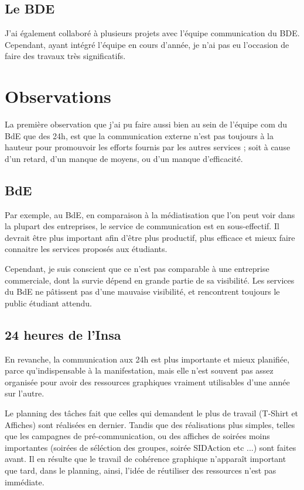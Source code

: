     \subsection{Le BDE}
    
        J'ai également collaboré à plusieurs projets avec l'équipe communication du BDE.
        Cependant, ayant intégré l'équipe en cours d'année, je n'ai pas eu l'occasion de faire des travaux très significatifs.

\section{Observations}

    La première observation que j'ai pu faire aussi bien au sein de l'équipe com du BdE que des 24h, est que la communication externe n'est pas toujours à la hauteur pour promouvoir les efforts fournis par les autres services ; soit à cause d'un retard, d'un manque de moyens, ou d'un manque d'efficacité.

    \subsection{BdE}

        Par exemple, au BdE, en comparaison à la médiatisation que l'on peut voir dans la plupart des entreprises, le service de communication est en sous-effectif. Il devrait être plus important afin d'être plus productif, plus efficace et mieux faire connaitre les services proposés aux étudiants.

        Cependant, je suis conscient que ce n'est pas comparable à une entreprise commerciale, dont la survie dépend en grande partie de sa visibilité.
        Les services du BdE ne pâtissent pas d'une mauvaise visibilité, et rencontrent toujours le public étudiant attendu.
    
    \subsection{24 heures de l'Insa}
        
        En revanche, la communication aux 24h est plus importante et mieux planifiée, parce qu'indispensable à la manifestation, mais elle n'est souvent pas assez organisée pour avoir des ressources graphiques vraiment utilisables d'une année sur l'autre.
        
        Le planning des tâches fait que celles qui demandent le plus de travail (T-Shirt et Affiches) sont réalisées en dernier.
        Tandis que des réalisations plus simples, telles que les campagnes de pré-communication, ou des affiches de soirées moins importantes (soirées de séléction des groupes, soirée SIDAction etc ...) sont faites avant.
        Il en résulte que le travail de cohérence graphique n'apparaît important que tard, dans le planning, ainsi, l'idée de réutiliser des ressources n'est pas immédiate.

